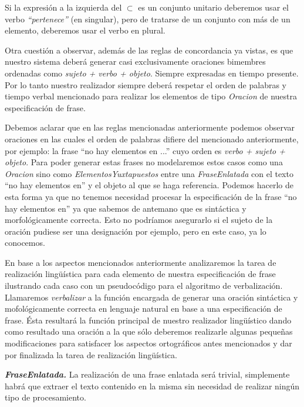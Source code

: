 \noindent
Si la expresión a la izquierda del $\subset$ es un conjunto unitario deberemos usar el verbo \emph{``pertenece''} (en singular), pero de tratarse de un conjunto con más de un elemento, deberemos usar el verbo en plural.

\medskip
Otra cuestión a observar, además de las reglas de concordancia ya vistas, es que nuestro sistema deberá generar casi exclusivamente oraciones bimembres ordenadas como \emph{sujeto + verbo + objeto}. Siempre expresadas en tiempo presente. Por lo tanto nuestro realizador siempre deberá respetar el orden de palabras y tiempo verbal mencionado para realizar los elementos de tipo \emph{Oracion} de nuestra especificación de frase. 

Debemos aclarar que en las reglas mencionadas anteriormente podemos observar oraciones en las cuales el orden de palabras difiere del mencionado anteriormente, por ejemplo: la frase ``no hay elementos en ...'' cuyo orden es \emph{verbo + sujeto + objeto}. Para poder generar estas frases no modelaremos estos casos como una \emph{Oracion} sino como \emph{ElementosYuxtapuestos} entre una \emph{FraseEnlatada} con el texto ``no hay elementos en'' y el objeto al que se haga referencia. Podemos hacerlo de esta forma ya que no tenemos necesidad procesar la especificación de la frase ``no hay elementos en'' ya que sabemos de antemano que es sintáctica y morfológicamente correcta. Esto no podríamos asegurarlo si el sujeto de la oración pudiese ser una designación por ejemplo, pero en este caso, ya lo conocemos.


\bigskip
En base a los aspectos mencionados anteriormente analizaremos la tarea de realización lingüística para cada elemento de nuestra especificación de frase ilustrando cada caso con un pseudocódigo para el algoritmo de verbalización. Llamaremos \emph{verbalizar} a la función encargada de generar una oración sintáctica y mofológicamente correcta en lenguaje natural en base a una especificación de frase. Ésta resultará la función principal de nuestro realizador lingüístico dando como resultado una oración a la que sólo deberemos realizarle algunas pequeñas modificaciones para satisfacer los aspectos ortográficos antes mencionados y dar por finalizada la tarea de realización lingüística.

\medskip
\noindent
\textbf{\emph{FraseEnlatada.}} La realización de una frase enlatada será trivial, simplemente habrá que extraer el texto contenido en la misma sin necesidad de realizar ningún tipo de procesamiento.

